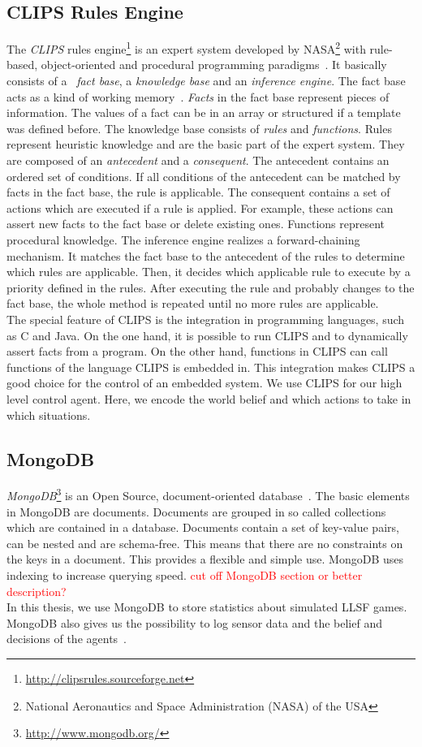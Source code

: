 \subsection{CLIPS Rules Engine}
The \textit{CLIPS} rules engine\footnote{\url{http://clipsrules.sourceforge.net}} is an expert system developed by NASA\footnote{National Aeronautics and Space Administration (NASA) of the USA} with rule-based, object-oriented and procedural programming paradigms~\cite{Clips,clips_manual}. It basically consists of a ~\textit{fact base}, a \textit{knowledge base} and an \textit{inference engine}. The fact base acts as a kind of working memory~\cite{Incremental}. \textit{Facts} in the fact base represent pieces of information. The values of a fact can be in an array or structured if a template was defined before. The knowledge base consists of \textit{rules} and \textit{functions}. Rules represent heuristic knowledge and are the basic part of the expert system. They are composed of an \textit{antecedent} and a \textit{consequent}. The antecedent contains an ordered set of conditions. If all conditions of the antecedent can be matched by facts in the fact base, the rule is applicable. The consequent contains a set of actions which are executed if a rule is applied. For example, these actions can assert new facts to the fact base or delete existing ones. Functions represent procedural knowledge. The inference engine realizes a forward-chaining mechanism. It matches the fact base to the antecedent of the rules to determine which rules are applicable. Then, it decides which applicable rule to execute by a priority defined in the rules. After executing the rule and probably changes to the fact base, the whole method is repeated until no more rules are applicable.\\
The special feature of CLIPS is the integration in programming languages, such as C and Java. On the one hand, it is possible to run CLIPS and to dynamically assert facts from a program. On the other hand, functions in CLIPS can call functions of the language CLIPS is embedded in. This integration makes CLIPS a good choice for the control of an embedded system. We use CLIPS for our high level control agent. Here, we encode the world belief and which actions to take in which situations.

\subsection{MongoDB}
\textit{MongoDB}\footnote{\url{http://www.mongodb.org/}} is an Open Source, document-oriented database~\cite{mongodb,KlingenDA}. The basic elements in MongoDB are documents. Documents are grouped in so called collections which are contained in a database. Documents contain a set of key-value pairs, can be nested and are schema-free. This means that there are no constraints on the keys in a document. This provides a flexible and simple use. MongoDB uses indexing to increase querying speed. \textcolor{red}{cut off MongoDB section or better description?}\\
In this thesis, we use MongoDB to store statistics about simulated LLSF games. MongoDB also gives us the possibility to log sensor data and the belief and decisions of the agents~\cite{KlingenDA}.
